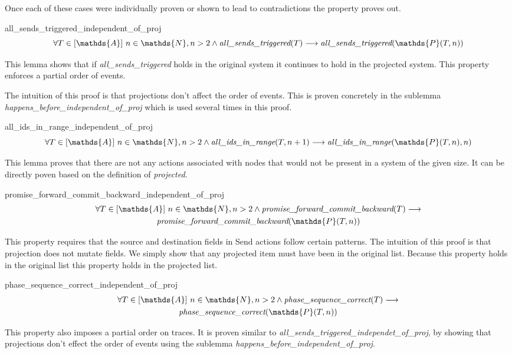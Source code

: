 \documentclass[runningheads]{llncs}
\newcommand{\action}{\mathds{A}}
\newcommand{\listaction}{[\action]}
\newcommand{\projectsize}[2]{\mathds{P}(#1, #2)}
\newcommand{\allst}[1]{\emph{all\_sends\_triggered}(#1)}
\newcommand{\allir}[2]{\emph{all\_ids\_in\_range}(#1, #2)}
\newcommand{\pfcb}[1]{\emph{promise\_forward\_commit\_backward}(#1)}
\newcommand{\psc}[1]{\emph{phase\_sequence\_correct}(#1)}
\begin{document}
Once each of these cases were individually proven or shown to lead to contradictions the property proves out.

\begin{lemma}{all\_sends\_triggered\_independent\_of\_proj}
$$ \forall T \in \listaction\ n \in \mathds{N}, n > 2 \wedge \allst{T} \longrightarrow \allst{\projectsize{T}{n}} $$
\end{lemma}
This lemma shows that if \emph{all\_sends\_triggered} holds in the original system it continues to hold in the projected system. This property enforces a partial order of events.

The intuition of this proof is that projections don't affect the order of events. This is proven concretely in the sublemma \emph{happens\_before\_independent\_of\_proj} which is used several times in this proof. 

\begin{lemma}{all\_ids\_in\_range\_independent\_of\_proj}
$$ \forall T \in \listaction\ n \in \mathds{N}, n > 2 \wedge \allir{T}{n+1} \longrightarrow \allir{\projectsize{T}{n}}{n} $$
\end{lemma}
This lemma proves that there are not any actions associated with nodes that would not be present in a system of the given size. It can be directly poven based on the definition of \emph{projected}. 

\begin{lemma}{promise\_forward\_commit\_backward\_independent\_of\_proj}
\begin{multline*}
\forall T \in \listaction\ n \in \mathds{N}, n > 2 \wedge \pfcb{T} \longrightarrow \\
\pfcb{\projectsize{T}{n}} 
\end{multline*}
\end{lemma}
This property requires that the source and destination fields in Send actions follow certain patterns. The intuition of this proof is that projection does not mutate fields. We simply show that any projected item must have been in the original list. Because this property holds in the original list this property holds in the projected list.

\begin{lemma}{phase\_sequence\_correct\_independent\_of\_proj}
\begin{multline*}
\forall T \in \listaction\ n \in \mathds{N}, n > 2 \wedge \psc{T} \longrightarrow \\
\psc{\projectsize{T}{n}}
\end{multline*}
\end{lemma}
This property also imposes a partial order on traces. It is proven similar to \emph{all\_sends\_triggered\_independet\_of\_proj}, by showing that projections don't effect the order of events using the sublemma \emph{happens\_before\_independent\_of\_proj}. 
\end{document}
